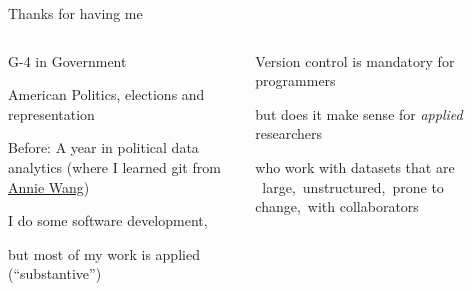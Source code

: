 \documentclass[ignorenonframetext,notes, 10pt, aspectratio=169]{beamer}
\begin{document}
\begin{frame}{Thanks for having me}

\begin{columns}[T]

\begin{column}{0.5\textwidth}
\begin{wideitemize}
\item G-4 in Government
\item American Politics, elections and representation
\item Before: A year in political data analytics (where I learned git from \href{https://anniejw.com/}{Annie Wang})
\end{wideitemize}\pause

\begin{wideitemize}
\item I do some software development, 
\item but most of my work is applied (``substantive'')
\end{wideitemize}
\end{column}\pause
\begin{column}{0.5\textwidth}
\begin{wideitemize}
\item Version control is mandatory for programmers\pause
\item but does it make sense for \emph{applied} researchers
\item who work with datasets that are \pause ~\alert{large},\pause ~\alert{unstructured},\pause ~\alert{prone to change},\pause ~\alert{with collaborators}
\end{wideitemize}
\end{column}
\end{columns}
\end{frame}
\end{document}
